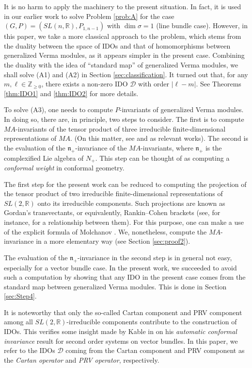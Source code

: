\documentclass[reqno,11pt]{amsart}
\theoremstyle{remark}
\numberwithin{equation}{section}
\newcommand{\fn}{{\mathfrak n}}
\newcommand{\R}{\mathbb{R}}
\newcommand{\Z}{\mathbb{Z}}
\newcommand{\Cal}{\mathcal}
\newcommand{\D}{\Cal{D}}
\begin{document}
It is no harm to apply the machinery to the present situation.
In fact, it is used in our earlier work \cite{KuOr25a} to solve Problem \ref{prob:A} for the case $(G, P)=(SL(n,\R), P_{1,n-1})$ with $\dim \sigma =1$ (line bundle case).
However, in this paper,  we take a more classical approach to 
the problem, which stems from 
the duality between the space of IDOs and 
that of homomorphisms between generalized Verma modules,
as it appears simpler in the present case. Combining the duality 
with the idea of ``standard map'' of generalized Verma modules, we shall solve
(A1) and (A2) in Section \ref{sec:classification}.
It turned out that,
for any $m, \ell \in \Z_{\geq 0}$, there exists a non-zero IDO $\D$  
with order $|\ell-m|$. See Theorems \ref{thm:IDO1} and \ref{thm:IDO2}
for more details.

To solve (A3), one needs to compute $P$-invariants of generalized Verma modules.
In doing so, there are, in principle, two steps to consider.
The first is to compute $MA$-invariants of the tensor product of three
irreducible finite-dimensional representations of $MA$.
(On this matter, see \cite[Thms.\ 4.3 and 5.5]{DES90} and \cite[Thm.\ 3]{EG11} 
as relevant works). 
The second is the evaluation of the $\fn_+$-invariance of the $MA$-invariants,
where $\fn_+$ is the complexified Lie algebra of $N_+$.
This step can be thought of as computing 
a \emph{conformal weight} in conformal geometry.

The first step for the present work can be reduced to computing the projection 
of the tensor product of two irreducible finite-dimensional representations 
of $SL(2,\R)$ onto its irreducible components. Such projections are known as 
Gordan's transvectants, or equivalently, Rankin--Cohen brackets
(see, for instance, \cite{Clerc25, ElGradechi06} for a relationship between them).
For this purpose, one can make a use of the explicit formula of
Molchanov \cite{Molchanov15}. We, nonetheless, compute the $MA$-invariance
in a more elementary way (see Section \ref{sec:proof2}).

The evaluation of the $\fn_+$-invariance in the second step 
is in general not easy, especially 
for a vector bundle case.
In the present work, we succeeded to 
avoid such a computation by showing that any IDO in the present case
comes from the standard map between generalized Verma modules.
This is done in Section \ref{sec:Step4}.

It is noteworthy that only the so-called Cartan component and PRV
component among all $SL(2,\R)$-irreducible components contribute to 
the construction of IDOs. This verifies some insight made by Kable in 
\cite[Intro.]{Kable18A} on his \emph{automatic conformal invariance} result 
for second order systems on vector bundles. In this paper, we refer to
the IDOs $\D$ coming from the Cartan component and PRV component as
the \emph{Cartan operator} and \emph{PRV operator}, respectively.
\end{document}
